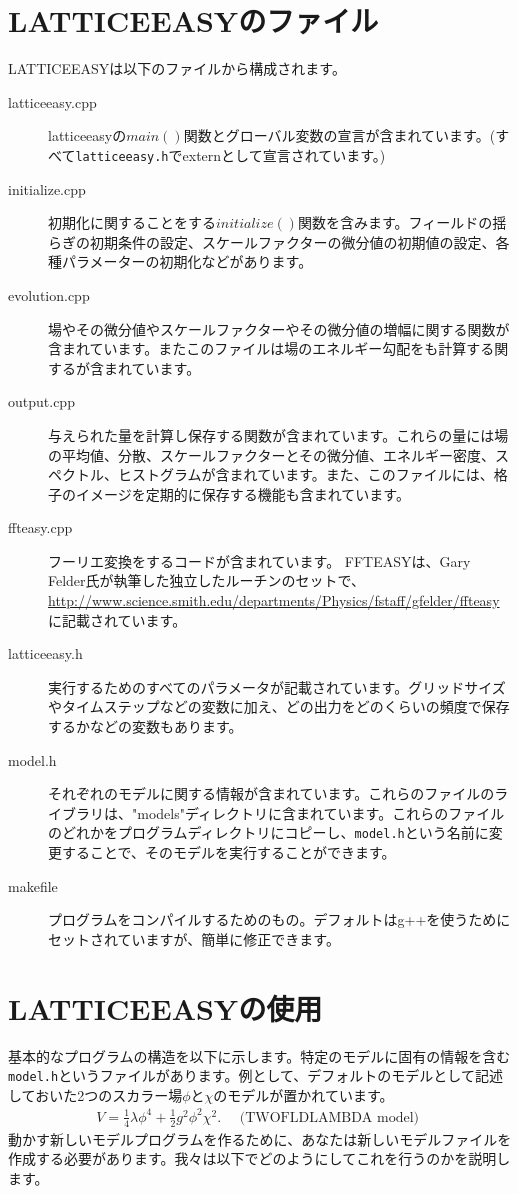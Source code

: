 \documentclass[dvipdfmx,11pt,a4paper,report]{jsbook}
\begin{document}
\chapter{LATTICEEASYのファイル}
LATTICEEASYは以下のファイルから構成されます。
\begin{description}
    \item[latticeeasy.cpp] latticeeasyの{\tt $main()$}関数とグローバル変数の宣言が含まれています。(すべて{\tt latticeeasy.h}でexternとして宣言されています。)
    \item[initialize.cpp] 初期化に関することをする{\tt $initialize()$}関数を含みます。フィールドの揺らぎの初期条件の設定、スケールファクターの微分値の初期値の設定、各種パラメーターの初期化などがあります。
    \item[evolution.cpp] 場やその微分値やスケールファクターやその微分値の増幅に関する関数が含まれています。またこのファイルは場のエネルギー勾配をも計算する関するが含まれています。
    \item[output.cpp] 与えられた量を計算し保存する関数が含まれています。これらの量には場の平均値、分散、スケールファクターとその微分値、エネルギー密度、スペクトル、ヒストグラムが含まれています。また、このファイルには、格子のイメージを定期的に保存する機能も含まれています。
    \item[ffteasy.cpp] フーリエ変換をするコードが含まれています。 FFTEASYは、Gary Felder氏が執筆した独立したルーチンのセットで、\url{http://www.science.smith.edu/departments/Physics/fstaff/gfelder/ffteasy}に記載されています。
    \item[latticeeasy.h] 実行するためのすべてのパラメータが記載されています。グリッドサイズやタイムステップなどの変数に加え、どの出力をどのくらいの頻度で保存するかなどの変数もあります。
    \item[model.h] それぞれのモデルに関する情報が含まれています。これらのファイルのライブラリは、"models"ディレクトリに含まれています。これらのファイルのどれかをプログラムディレクトリにコピーし、{\tt model.h}という名前に変更することで、そのモデルを実行することができます。
    \item[makefile] プログラムをコンパイルするためのもの。デフォルトはg++を使うためにセットされていますが、簡単に修正できます。
\end{description}


\chapter{LATTICEEASYの使用}
基本的なプログラムの構造を以下に示します。特定のモデルに固有の情報を含む{\tt model.h}というファイルがあります。例として、デフォルトのモデルとして記述しておいた2つのスカラー場$\phi$と$\chi$のモデルが置かれています。
\begin{align}
    V=\frac{1}{4} \lambda \phi^{4}+\frac{1}{2} g^{2} \phi^{2} \chi^{2} . \quad \text { (TWOFLDLAMBDA model) }
\end{align}
動かす新しいモデルプログラムを作るために、あなたは新しいモデルファイルを作成する必要があります。我々は以下でどのようにしてこれを行うのかを説明します。
\end{document}
